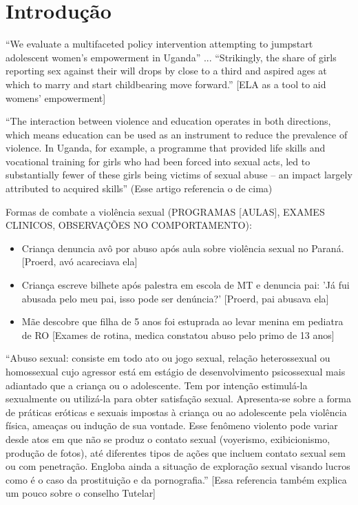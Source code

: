 \chapter{Introdução}\label{Capitulo:Introducao}

``We evaluate a multifaceted policy intervention attempting to jumpstart adolescent women’s empowerment in Uganda'' ... ``Strikingly, the share of girls reporting sex against their will drops by close to a third and aspired ages at which to marry and start childbearing move forward.'' \cite{bandiera2017women} [ELA as a tool to aid womens’ empowerment]

``The interaction between violence and education operates in both directions, which means education can be used as an instrument to reduce the prevalence of violence. In Uganda, for example, a programme that provided life skills and vocational training for girls who had been forced into sexual acts, led to substantially fewer of these girls being victims of sexual abuse – an impact largely attributed to acquired skills''  \cite{owidviolenceagainstrightsforchildren} (Esse artigo referencia o de cima)


Formas de combate a violência sexual (PROGRAMAS [AULAS], EXAMES CLINICOS, OBSERVAÇÕES NO COMPORTAMENTO):

\begin{itemize}
  \item Criança denuncia avô por abuso após aula sobre violência sexual no Paraná. \cite{central2019crianca} [Proerd, avó acareciava ela]
  \item Criança escreve bilhete após palestra em escola de MT e denuncia pai: 'Já fui abusada pelo meu pai, isso pode ser denúncia?' \cite{lidiane2018crianca} [Proerd, pai abusava ela]
  \item Mãe descobre que filha de 5 anos foi estuprada ao levar menina em pediatra de RO \cite{jonatas2018crianca} [Exames de rotina, medica constatou abuso pelo primo de 13 anos]
\end{itemize}





``Abuso sexual: consiste em todo ato ou jogo sexual, relação heterossexual ou homossexual cujo agressor está em estágio de desenvolvimento psicossexual mais adiantado que a criança ou o adolescente. Tem por intenção estimulá-la sexualmente ou utilizá-la para obter satisfação sexual. Apresenta-se sobre a forma de práticas eróticas e sexuais impostas à criança ou ao adolescente pela violência física, ameaças ou indução de sua vontade. Esse fenômeno violento pode variar desde atos em que não se produz o contato sexual (voyerismo, exibicionismo, produção de fotos), até diferentes tipos de ações que incluem contato sexual sem ou com penetração. Engloba ainda a situação de exploração sexual visando lucros como é o caso da prostituição e da pornografia.'' \cite{saude2002notificacao} [Essa referencia também explica um pouco sobre o conselho Tutelar]


